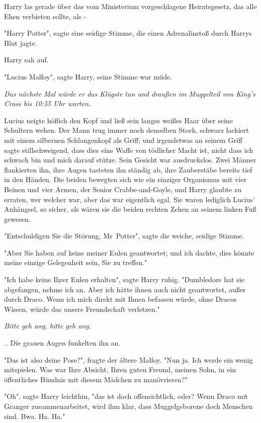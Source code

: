 {Harry las gerade über das vom Ministerium vorgeschlagene Heiratsgesetz, das alle Ehen verbieten sollte, als -

"Harry Potter", sagte eine seidige Stimme, die einen Adrenalinstoß durch Harrys Blut jagte.

Harry sah auf.

"Lucius Malfoy", sagte Harry, seine Stimme war müde.

\emph{Das nächste Mal würde er das Klügste tun und draußen im Muggelteil von King's Cross bis 10:55 Uhr warten.}

Lucius neigte höflich den Kopf und ließ sein langes weißes Haar über seine Schultern wehen. Der Mann trug immer noch denselben Stock, schwarz lackiert mit einem silbernen Schlangenkopf als Griff; und irgendetwas an seinem Griff sagte stillschweigend, dass dies eine Waffe von tödlicher Macht ist, nicht dass ich schwach bin und mich darauf stütze. Sein Gesicht war ausdruckslos. Zwei Männer flankierten ihn, ihre Augen tasteten ihn ständig ab, ihre Zauberstäbe bereits tief in den Händen. Die beiden bewegten sich wie ein einziger Organismus mit vier Beinen und vier Armen, der Senior Crabbe-and-Goyle, und Harry glaubte zu erraten, wer welcher war, aber das war eigentlich egal. Sie waren lediglich Lucius' Anhängsel, so sicher, als wären sie die beiden rechten Zehen an seinem linken Fuß gewesen.

"Entschuldigen Sie die Störung, Mr~Potter", sagte die weiche, seidige Stimme.

"Aber Sie haben auf keine meiner Eulen geantwortet; und ich dachte, dies könnte meine einzige Gelegenheit sein, Sie zu treffen."

"Ich habe keine Ihrer Eulen erhalten", sagte Harry ruhig. "Dumbledore hat sie abgefangen, nehme ich an. Aber ich hätte ihnen auch nicht geantwortet, außer durch Draco. Wenn ich mich direkt mit Ihnen befassen würde, ohne Dracos Wissen, würde das unsere Freundschaft verletzen."

\emph{Bitte geh weg, bitte geh weg.}

.. Die grauen Augen funkelten ihn an.

"Das ist also deine Pose?", fragte der ältere Malfoy. "Nun ja. Ich werde ein wenig mitspielen. Was war Ihre Absicht, Ihren guten Freund, meinen Sohn, in ein öffentliches Bündnis mit diesem Mädchen zu manövrieren?"

"Oh", sagte Harry leichthin, "das ist doch offensichtlich, oder? Wenn Draco mit Granger zusammenarbeitet, wird ihm klar, dass Muggelgeborene doch Menschen sind. Bwa. Ha. Ha."

}
